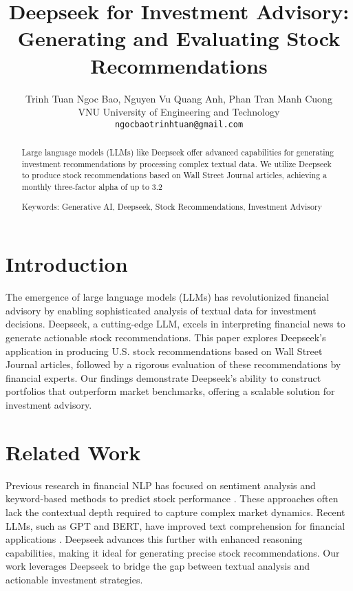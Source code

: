 \documentclass{article}
\title{Deepseek for Investment Advisory: Generating and Evaluating Stock Recommendations}
\author{
  Trinh Tuan Ngoc Bao,
  Nguyen Vu Quang Anh,
  Phan Tran Manh Cuong \\
  VNU University of Engineering and Technology\\
  \texttt{ngocbaotrinhtuan@gmail.com}
}
\begin{document}
\maketitle

\begin{abstract}
Large language models (LLMs) like Deepseek offer advanced capabilities for generating investment recommendations by processing complex textual data. We utilize Deepseek to produce stock recommendations based on Wall Street Journal articles, achieving a monthly three-factor alpha of up to 3.2%

Keywords: Generative AI, Deepseek, Stock Recommendations, Investment Advisory
\end{abstract}

\section{Introduction}
The emergence of large language models (LLMs) has revolutionized financial advisory by enabling sophisticated analysis of textual data for investment decisions. Deepseek, a cutting-edge LLM, excels in interpreting financial news to generate actionable stock recommendations. This paper explores Deepseek’s application in producing U.S. stock recommendations based on Wall Street Journal articles, followed by a rigorous evaluation of these recommendations by financial experts. Our findings demonstrate Deepseek’s ability to construct portfolios that outperform market benchmarks, offering a scalable solution for investment advisory.

\section{Related Work}
Previous research in financial NLP has focused on sentiment analysis and keyword-based methods to predict stock performance \citep{tetlock2008, loughran2011}. These approaches often lack the contextual depth required to capture complex market dynamics. Recent LLMs, such as GPT and BERT, have improved text comprehension for financial applications \citep{araci2019, yang2020}. Deepseek advances this further with enhanced reasoning capabilities, making it ideal for generating precise stock recommendations. Our work leverages Deepseek to bridge the gap between textual analysis and actionable investment strategies.
\end{document}
